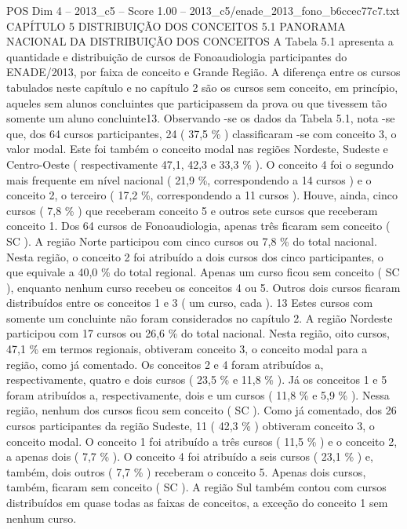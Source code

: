 \begin{textsample}{POS Dim 4 – 2013\_c5 – Score 1.00 – 2013\_c5/enade\_2013\_fono\_b6ccec77c7.txt}  \label{ex:f4_pos_230}
CAPÍTULO 5 DISTRIBUIÇÃO DOS CONCEITOS 5.1 PANORAMA NACIONAL DA DISTRIBUIÇÃO DOS CONCEITOS A Tabela 5.1 apresenta a quantidade e distribuição de cursos de Fonoaudiologia participantes do ENADE/2013, por faixa de conceito e Grande Região.
A diferença entre os cursos tabulados neste capítulo e no capítulo 2 são os cursos sem conceito, em princípio, aqueles sem alunos concluintes que participassem da prova ou que tivessem tão somente um aluno concluinte13.
Observando -se os dados da Tabela 5.1, nota -se que, dos 64 cursos participantes, 24 ( 37,5 \% ) classificaram -se com conceito 3, o valor modal.
Este foi também o conceito modal nas regiões Nordeste, Sudeste e Centro-Oeste ( respectivamente 47,1, 42,3 e 33,3 \% ).
O conceito 4 foi o segundo mais frequente em nível nacional ( 21,9 \%, correspondendo a 14 cursos ) e o conceito 2, o terceiro ( 17,2 \%, correspondendo a 11 cursos ).
Houve, ainda, cinco cursos ( 7,8 \% ) que receberam conceito 5 e outros sete cursos que receberam conceito 1.
Dos 64 cursos de Fonoaudiologia, apenas três ficaram sem conceito ( SC ).
A região Norte participou com cinco cursos ou 7,8 \% do total nacional.
Nesta região, o conceito 2 foi atribuído a dois cursos dos cinco participantes, o que equivale a 40,0 \% do total regional.
Apenas um curso ficou sem conceito ( SC ), enquanto nenhum curso recebeu os conceitos 4 ou 5.
Outros dois cursos ficaram distribuídos entre os conceitos 1 e 3 ( um curso, cada ). 13 Estes cursos com somente um concluinte não foram considerados no capítulo 2.
A região Nordeste participou com 17 cursos ou 26,6 \% do total nacional.
Nesta região, oito cursos, 47,1 \% em termos regionais, obtiveram conceito 3, o conceito modal para a região, como já comentado.
Os conceitos 2 e 4 foram atribuídos a, respectivamente, quatro e dois cursos ( 23,5 \% e 11,8 \% ).
Já os conceitos 1 e 5 foram atribuídos a, respectivamente, dois e um cursos ( 11,8 \% e 5,9 \% ).
Nessa região, nenhum dos cursos ficou sem conceito ( SC ).
Como já comentado, dos 26 cursos participantes da região Sudeste, 11 ( 42,3 \% ) obtiveram conceito 3, o conceito modal.
O conceito 1 foi atribuído a três cursos ( 11,5 \% ) e o conceito 2, a apenas dois ( 7,7 \% ).
O conceito 4 foi atribuído a seis cursos ( 23,1 \% ) e, também, dois outros ( 7,7 \% ) receberam o conceito 5.
Apenas dois cursos, também, ficaram sem conceito ( SC ).
A região Sul também contou com cursos distribuídos em quase todas as faixas de conceitos, a exceção do conceito 1 sem nenhum curso.

\end{textsample}
